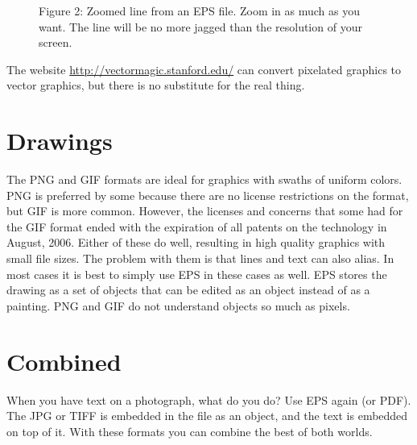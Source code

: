 \documentclass[a4paper]{article}
\begin{document}
\begin{figure}
\label{figure2}
\noindent{}
\caption{Figure 2: Zoomed line from an EPS file. Zoom in as much as you want. The line will be no more jagged than the resolution of your screen.}
\end{figure}

The website \url{http://vectormagic.stanford.edu/} can convert pixelated
graphics to vector graphics, but there is no substitute for the real
thing.


\section{Drawings%
  \label{drawings}%
}

The PNG and GIF formats are ideal for graphics with swaths of uniform
colors. PNG is preferred by some because there are no license
restrictions on the format, but GIF is more common. However, the
licenses and concerns that some had for the GIF format ended with the
expiration of all patents on the technology in August, 2006. Either of
these do well, resulting in high quality graphics with small file sizes.
The problem with them is that lines and text can also alias. In most
cases it is best to simply use EPS in these cases as well. EPS stores
the drawing as a set of objects that can be edited as an object instead
of as a painting. PNG and GIF do not understand objects so much as
pixels.


\section{Combined%
  \label{combined}%
}

When you have text on a photograph, what do you do? Use EPS again (or
PDF). The JPG or TIFF is embedded in the file as an object, and the text
is embedded on top of it. With these formats you can combine the best of
both worlds.
\end{document}

